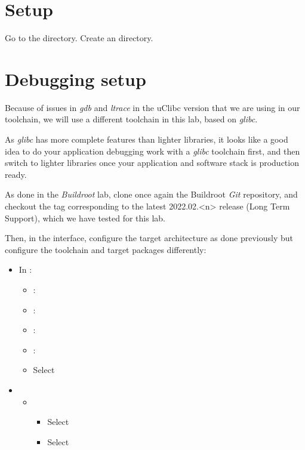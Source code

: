 
\section{Setup}

Go to the  directory.
Create an  directory.

\section{Debugging setup}

Because of issues in {\em gdb} and {\em ltrace} in the uClibc version
that we are using in our toolchain, we will use a different toolchain
in this lab, based on {\em glibc}.

As {\em glibc} has more complete features than lighter libraries,
it looks like a good idea to do your application debugging work
with a {\em glibc} toolchain first, and then switch to lighter libraries
once your application and software stack is production ready.

As done in the {\em Buildroot} lab, clone once again the Buildroot
{\em Git} repository, and checkout the tag corresponding to the latest
2022.02.<n> release (Long Term Support), which we have tested for this lab.

Then, in the  interface, configure the target
architecture as done previously but configure the toolchain and
target packages differently:

\begin{itemize}
\item In :
   \begin{itemize}
   \item {}: 
   \item {}: 
   \item {}: 
   \item {}: 
   \item Select 
   \end{itemize}
 \item {}
   \begin{itemize}
   \item {}
     \begin{itemize}
     \item Select 
     \item Select 
     \end{itemize}
   \end{itemize}
\end{itemize}

